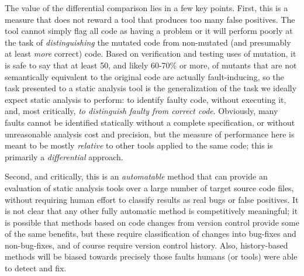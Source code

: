 The value of the differential comparison lies in a few key points.  First, this is a measure that does not reward a tool that produces too many false positives.  The tool cannot simply flag all code as having a problem or it will perform poorly at the task of \emph{distinguishing} the mutated code from non-mutated (and presumably at least \emph{more} correct) code.  Based on verification and testing uses of mutation, it is safe to say that at least 50, and likely 60-70\% or more, of mutants that are not semantically equivalent to the original code are actually fault-inducing, so the task presented to a static analysis tool is the generalization of the task we ideally expect static analysis to perform:  to identify faulty code, without executing it, and, most critically, \emph{to distinguish faulty from correct code}.  Obviously, many faults cannot be identified statically without a complete specification, or without unreasonable analysis cost and precision, but the measure of performance here is meant to be mostly \emph{relative} to other tools applied to the same code; this is primarily a \emph{differential} approach.

Second, and critically, this is an \emph{automatable} method that can provide an evaluation of static analysis tools over a large number of target source code files, without requiring human effort to classify results as real bugs or false positives.  It is not clear that any other fully automatic method is competitively meaningful; it is possible that methods based on code changes from version control provide some of the same benefits, but these require classification of changes into bug-fixes and non-bug-fixes, and of course require version control history.  Also, history-based methods will be biased towards precisely those faults humans (or tools) were able to detect and fix.

